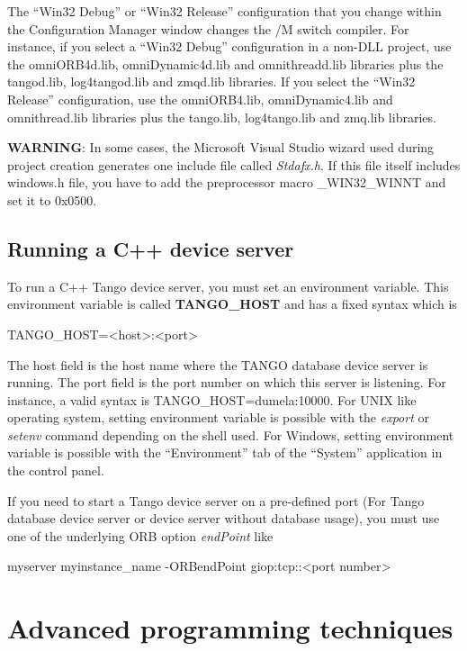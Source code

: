 The ``Win32 Debug'' or ``Win32 Release'' configuration that you
change within the \textquotedbl{}Configuration Manager\textquotedbl{}
window changes the /M switch compiler. For instance, if you select
a ``Win32 Debug'' configuration in a \textquotedbl{}non-DLL\textquotedbl{}
project, use the omniORB4d.lib, omniDynamic4d.lib and omnithreadd.lib
libraries plus the tangod.lib, log4tangod.lib and zmqd.lib libraries.
If you select the ``Win32 Release'' configuration, use the omniORB4.lib,
omniDynamic4.lib and omnithread.lib libraries plus the tango.lib,
log4tango.lib and zmq.lib libraries.

\textbf{WARNING}: In some cases, the Microsoft Visual Studio wizard
used during project creation generates one include file called \emph{Stdafx.h}.
If this file itself includes windows.h file, you have to add the preprocessor
macro \_WIN32\_WINNT and set it to 0x0500.

\subsection{Running a C++ device server\label{Env variable}}

To run a C++ Tango device server, you must set an environment variable.
This environment variable is called \textbf{TANGO\_HOST}
and has a fixed syntax which is \begin{center}TANGO\_HOST=<host>:<port>\end{center}The
host field is the host name where the TANGO database device server
is running. The port field is the port number on which this server
is listening. For instance, a valid syntax is TANGO\_HOST=dumela:10000.
For UNIX like operating system, setting environment variable is possible
with the \emph{export} or \emph{setenv} command depending on the shell
used. For Windows, setting environment variable is possible with the
``Environment'' tab of the ``System'' application in the control
panel.

If you need to start a Tango device server on a pre-defined port
(For Tango database device server or device server without database
usage), you must use one of the underlying ORB option \emph{endPoint}
like \begin{center}myserver myinstance\_name -ORBendPoint giop:tcp::<port
number>\end{center}

\section{Advanced programming techniques}

